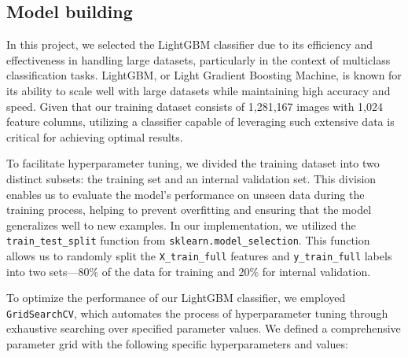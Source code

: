 \documentclass[a4paper,11pt]{article}
\begin{document}
\subsection{Model building}

In this project, we selected the LightGBM classifier due to its efficiency and effectiveness in handling large datasets, particularly in the context of multiclass classification tasks. LightGBM, or Light Gradient Boosting Machine, is known for its ability to scale well with large datasets while maintaining high accuracy and speed. Given that our training dataset consists of 1,281,167 images with 1,024 feature columns, utilizing a classifier capable of leveraging such extensive data is critical for achieving optimal results.

To facilitate hyperparameter tuning, we divided the training dataset into two distinct subsets: the training set and an internal validation set. This division enables us to evaluate the model's performance on unseen data during the training process, helping to prevent overfitting and ensuring that the model generalizes well to new examples. In our implementation, we utilized the \texttt{train\_test\_split} function from \texttt{sklearn.model\_selection}. This function allows us to randomly split the \texttt{X\_train\_full} features and \texttt{y\_train\_full} labels into two sets—80\% of the data for training and 20\% for internal validation. 

To optimize the performance of our LightGBM classifier, we employed \texttt{GridSearchCV}, which automates the process of hyperparameter tuning through exhaustive searching over specified parameter values. We defined a comprehensive parameter grid with the following specific hyperparameters and values:
\end{document}
